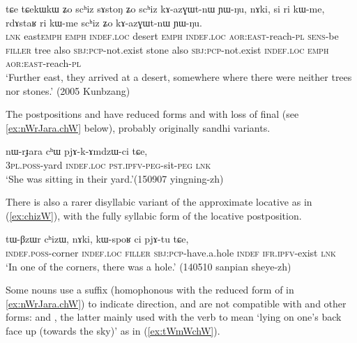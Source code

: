 \begin{exe}
\ex \label{ex:schiz.kazGWtnW}
 \gll  tɕe tɕekɯ\redp{}kɯ ʑo scʰiz sɤstoŋ ʑo scʰiz kɤ-azɣɯt-nɯ ɲɯ-ŋu, nɤki, si ri kɯ-me, rdɤstaʁ ri kɯ-me scʰiz ʑo kɤ-azɣɯt-nɯ ɲɯ-ŋu. \\
 \textsc{lnk} east\redp{}\textsc{emph} \textsc{emph} \textsc{indef}.\textsc{loc} desert \textsc{emph} \textsc{indef}.\textsc{loc} \textsc{aor}:\textsc{east}-reach-\textsc{pl} \textsc{sens}-be \textsc{filler} tree also \textsc{sbj}:\textsc{pcp}-not.exist stone also \textsc{sbj}:\textsc{pcp}-not.exist \textsc{indef}.\textsc{loc}  \textsc{emph}  \textsc{aor}:\textsc{east}-reach-\textsc{pl} \\
 \glt `Further east, they arrived at  a desert, somewhere where there were neither trees nor stones.' (2005 Kunbzang)
\end{exe}

The postpositions  and  have reduced forms  and  with loss of final  (see \ref{ex:nWrJara.chW} below), probably originally sandhi variants.

\begin{exe}
\ex \label{ex:nWrJara.chW}
\gll nɯ-rɟara cʰɯ pjɤ-k-ɤmdzɯ-ci tɕe, \\
\textsc{3pl}.\textsc{poss}-yard \textsc{indef}.\textsc{loc} \textsc{pst}.\textsc{ipfv}-\textsc{peg}-sit-\textsc{peg} \textsc{lnk} \\
\glt `She was sitting in their yard.'(150907 yingning-zh) 
\end{exe}

There is also a rarer disyllabic variant of the approximate locative  as in (\ref{ex:chizW}), with the fully syllabic form  of the locative postposition.
\largerpage
\begin{exe}
\ex \label{ex:chizW}
\gll tɯ-βzɯr cʰizɯ, nɤki, kɯ-spoʁ ci pjɤ-tu tɕe,  \\
\textsc{indef}.\textsc{poss}-corner \textsc{indef}.\textsc{loc} \textsc{filler} \textsc{sbj}:\textsc{pcp}-have.a.hole \textsc{indef} \textsc{ifr}.\textsc{ipfv}-exist \textsc{lnk} \\
\glt `In one of the corners, there was a hole.' (140510 sanpian sheye-zh) 
\end{exe}

Some nouns use a suffix  (homophonous with the reduced form of  in \ref{ex:nWrJara.chW}) to indicate direction, and are not compatible with  and other forms:  and , the latter mainly used with the verb  to mean `lying on one's back face up (towards the sky)' as in (\ref{ex:tWmWchW}).

